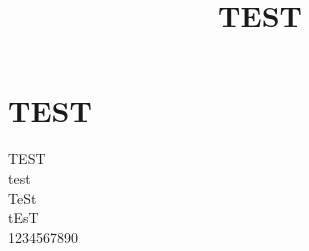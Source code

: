 \documentclass[]{jarticle}
\title{TEST}
\begin{document}
\maketitle

\section{TEST}
TEST\\
test\\
TeSt\\
tEsT\\
1234567890
\end{document}
